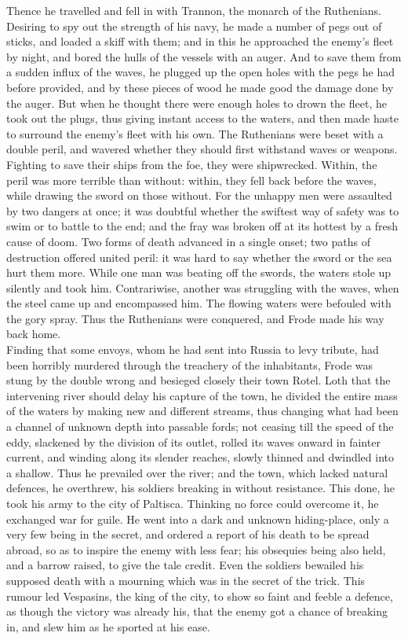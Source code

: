 \documentclass[10pt,a4paper]{report}
\begin{document}
Thence he travelled and fell in with Trannon, the monarch of the Ruthenians. Desiring to spy out the strength of his navy, he made a number of pegs out of sticks, and loaded a skiff with them; and in this he approached the enemy's fleet by night, and bored the hulls of the vessels with an auger. And to save them from a sudden influx of the waves, he plugged up the open holes with the pegs he had before provided, and by these pieces of wood he made good the damage done by the auger. But when he thought there were enough holes to drown the fleet, he took out the plugs, thus giving instant access to the waters, and then made haste to surround the enemy's fleet with his own. The Ruthenians were beset with a double peril, and wavered whether they should first withstand waves or weapons. Fighting to save their ships from the foe, they were shipwrecked. Within, the peril was more terrible than without: within, they fell back before the waves, while drawing the sword on those without. For the unhappy men were assaulted by two dangers at once; it was doubtful whether the swiftest way of safety was to swim or to battle to the end; and the fray was broken off at its hottest by a fresh cause of doom. Two forms of death advanced in a single onset; two paths of destruction offered united peril: it was hard to say whether the sword or the sea hurt them more. While one man was beating off the swords, the waters stole up silently and took him. Contrariwise, another was struggling with the waves, when the steel came up and encompassed him. The flowing waters were befouled with the gory spray. Thus the Ruthenians were conquered, and Frode made his way back home.\\

Finding that some envoys, whom he had sent into Russia to levy tribute, had been horribly murdered through the treachery of the inhabitants, Frode was stung by the double wrong and besieged closely their town Rotel. Loth that the intervening river should delay his capture of the town, he divided the entire mass of the waters by making new and different streams, thus changing what had been a channel of unknown depth into passable fords; not ceasing till the speed of the eddy, slackened by the division of its outlet, rolled its waves onward in fainter current, and winding along its slender reaches, slowly thinned and dwindled into a shallow. Thus he prevailed over the river; and the town, which lacked natural defences, he overthrew, his soldiers breaking in without resistance. This done, he took his army to the city of Paltisca. Thinking no force could overcome it, he exchanged war for guile. He went into a dark and unknown hiding-place, only a very few being in the secret, and ordered a report of his death to be spread abroad, so as to inspire the enemy with less fear; his obsequies being also held, and a barrow raised, to give the tale credit. Even the soldiers bewailed his supposed death with a mourning which was in the secret of the trick. This rumour led Vespasins, the king of the city, to show so faint and feeble a defence, as though the victory was already his, that the enemy got a chance of breaking in, and slew him as he sported at his ease.\\
\end{document}

